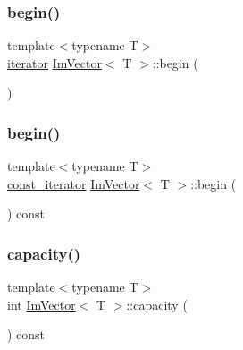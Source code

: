 \mbox{\label{class_im_vector_a300a8b559cd87a78063046ef81151bce}} 
\subsubsection{\texorpdfstring{begin()}{begin()}\hspace{0.1cm}{\footnotesize\ttfamily [1/2]}}
{\footnotesize\ttfamily template$<$typename T$>$ \\
\mbox{\hyperlink{class_im_vector_a74b5478f1f6fd471cc71219bce483db6}{iterator}} \mbox{\hyperlink{class_im_vector}{Im\+Vector}}$<$ T $>$\+::begin (\begin{DoxyParamCaption}{ }\end{DoxyParamCaption})\hspace{0.3cm}{\ttfamily [inline]}}

\mbox{\label{class_im_vector_ac72cd4105b5c6a7f76157df945b39d4c}} 
\subsubsection{\texorpdfstring{begin()}{begin()}\hspace{0.1cm}{\footnotesize\ttfamily [2/2]}}
{\footnotesize\ttfamily template$<$typename T$>$ \\
\mbox{\hyperlink{class_im_vector_aedeac9c5080f9d6ce96ae837768ee4c4}{const\+\_\+iterator}} \mbox{\hyperlink{class_im_vector}{Im\+Vector}}$<$ T $>$\+::begin (\begin{DoxyParamCaption}{ }\end{DoxyParamCaption}) const\hspace{0.3cm}{\ttfamily [inline]}}

\mbox{\label{class_im_vector_ac17681baa8b9b5cd97e556da29f9ef73}} 
\subsubsection{\texorpdfstring{capacity()}{capacity()}}
{\footnotesize\ttfamily template$<$typename T$>$ \\
int \mbox{\hyperlink{class_im_vector}{Im\+Vector}}$<$ T $>$\+::capacity (\begin{DoxyParamCaption}{ }\end{DoxyParamCaption}) const\hspace{0.3cm}{\ttfamily [inline]}}

